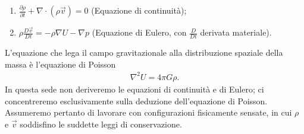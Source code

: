 \begin{enumerate}[label=\protect\circled{\arabic*}]
    \item $\frac{\partial \rho}{\partial t} + \nabla \cdot (\rho \vec{v}) = 0$ \quad (Equazione di continuità);
    \item $\rho \frac{D \vec{v}}{Dt} = -\rho \nabla U - \nabla p$ \quad (Equazione di Eulero, con $\frac{D}{Dt}$ derivata materiale).
\end{enumerate}
L'equazione che lega il campo gravitazionale alla distribuzione spaziale della massa è l'equazione di Poisson
\begin{align}
    \nabla^2 U = 4 \pi G \rho.
\end{align}
In questa sede non deriveremo le equazioni di continuità e di Eulero; ci concentreremo esclusivamente sulla deduzione dell'equazione di Poisson. Assumeremo pertanto di lavorare con configurazioni fisicamente sensate, in cui $\rho$ e $\vec{v}$ soddisfino le suddette leggi di conservazione.
